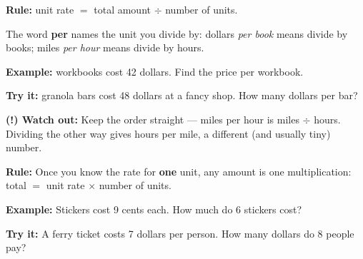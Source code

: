 \documentclass[12pt]{article}
\begin{document}


\begin{formulabox}
\textbf{Rule:} \quad unit rate $=$ total amount $\div$ number of units.\par
The word \textbf{per} names the unit you divide by: dollars \emph{per book}
means divide by books; miles \emph{per hour} means divide by hours.
\end{formulabox}

\begin{examplebox}
\textbf{Example:}  workbooks cost 42 dollars. Find the price per
workbook.
\end{examplebox}

\begin{tryitbox}
\textbf{Try it:}  granola bars cost 48 dollars at a fancy shop. How many
dollars per bar?\\[2pt]
\end{tryitbox}

\begin{watchoutbox}
\textbf{(!) Watch out:} Keep the order straight — miles per hour is miles
$\div$ hours. Dividing the other way gives hours per mile, a different (and
usually tiny) number.
\end{watchoutbox}


\begin{formulabox}
\textbf{Rule:} Once you know the rate for \textbf{one} unit, any amount is one
multiplication: \quad total $=$ unit rate $\times$ number of units.
\end{formulabox}

\begin{examplebox}
\textbf{Example:} \quad Stickers cost 9 cents each. How much do 6 stickers
cost?
\end{examplebox}

\begin{tryitbox}
\textbf{Try it:} \quad A ferry ticket costs 7 dollars per person. How many
dollars do 8 people pay?\\[2pt]
\end{tryitbox}
\end{document}
